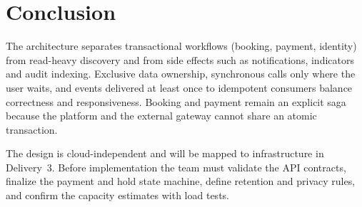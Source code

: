 \section{Conclusion}
\label{ch:reflection}

The architecture separates transactional workflows (booking, payment,
identity) from read-heavy discovery and from side effects such as
notifications, indicators and audit indexing. Exclusive data ownership,
synchronous calls only where the user waits, and events delivered at least
once to idempotent consumers balance correctness and responsiveness. Booking
and payment remain an explicit saga because the platform and the external
gateway cannot share an atomic transaction.

The design is cloud-independent and will be mapped to infrastructure in
Delivery~3. Before implementation the team must validate the API contracts,
finalize the payment and hold state machine, define retention and privacy
rules, and confirm the capacity estimates with load tests.
